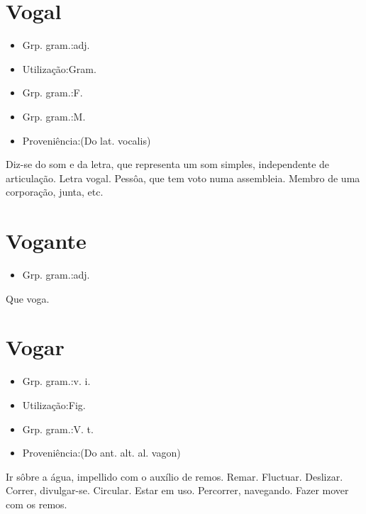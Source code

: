 \documentclass{article}
\begin{document}
\section{Vogal}
\begin{itemize}
\item {Grp. gram.:adj.}
\end{itemize}
\begin{itemize}
\item {Utilização:Gram.}
\end{itemize}
\begin{itemize}
\item {Grp. gram.:F.}
\end{itemize}
\begin{itemize}
\item {Grp. gram.:M.}
\end{itemize}
\begin{itemize}
\item {Proveniência:(Do lat. \textunderscore vocalis\textunderscore )}
\end{itemize}
Diz-se do som e da letra, que representa um som simples, independente de articulação.
Letra vogal.
Pessôa, que tem voto numa assembleia.
Membro de uma corporação, junta, etc.
\section{Vogante}
\begin{itemize}
\item {Grp. gram.:adj.}
\end{itemize}
Que voga.
\section{Vogar}
\begin{itemize}
\item {Grp. gram.:v. i.}
\end{itemize}
\begin{itemize}
\item {Utilização:Fig.}
\end{itemize}
\begin{itemize}
\item {Grp. gram.:V. t.}
\end{itemize}
\begin{itemize}
\item {Proveniência:(Do ant. alt. al. \textunderscore vagon\textunderscore )}
\end{itemize}
Ir sôbre a água, impellido com o auxílio de remos.
Remar.
Fluctuar.
Deslizar.
Correr, divulgar-se.
Circular.
Estar em uso.
Percorrer, navegando.
Fazer mover com os remos.
\end{document}
